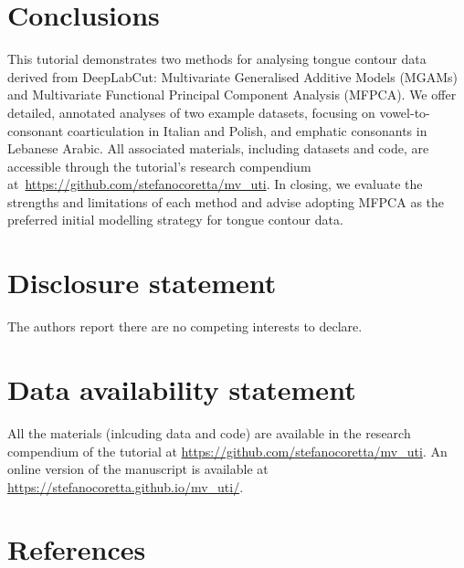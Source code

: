 \documentclass[
  man,
  longtable,
  nolmodern,
  notxfonts,
  notimes,
  colorlinks=true,linkcolor=blue,citecolor=blue,urlcolor=blue]{apa7}
\begin{document}
\section{Conclusions}\label{conclusions}

This tutorial demonstrates two methods for analysing tongue contour data
derived from DeepLabCut: Multivariate Generalised Additive Models
(MGAMs) and Multivariate Functional Principal Component Analysis
(MFPCA). We offer detailed, annotated analyses of two example datasets,
focusing on vowel-to-consonant coarticulation in Italian and Polish, and
emphatic consonants in Lebanese Arabic. All associated materials,
including datasets and code, are accessible through the tutorial's
research compendium at~\url{https://github.com/stefanocoretta/mv_uti}.
In closing, we evaluate the strengths and limitations of each method and
advise adopting MFPCA as the preferred initial modelling strategy for
tongue contour data.

\section*{Disclosure statement}\label{disclosure-statement}

The authors report there are no competing interests to declare.

\section*{\texorpdfstring{\textbf{Data availability
statement}}{Data availability statement}}\label{data-availability-statement}

All the materials (inlcuding data and code) are available in the
research compendium of the tutorial at
\url{https://github.com/stefanocoretta/mv_uti}. An online version of the
manuscript is available at
\url{https://stefanocoretta.github.io/mv_uti/}.

\section{References}\label{references}
\end{document}
